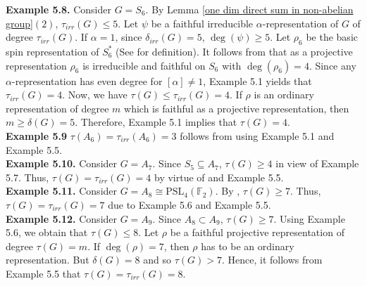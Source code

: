 \documentclass[a4paper,11pt]{amsart}
\numberwithin{equation}{section}
\numberwithin{equation}{subsection}
\newcommand{\F}{\mathbb{F}}
\newcommand{\di}{\delta_{irr}(G)}
\newcommand{\poonam}[1]{{\color{blue} #1}}
\begin{document}
\textbf{Example 5.8.} 
Consider $G= S_6$. By Lemma \ref{one dim direct sum in non-abelian group}$(2)$, $\tau_{irr}(G) \leq 5$. Let $\psi$ be a faithful irreducible $\alpha$-representation of $G$ of degree $\tau_{irr}(G)$. If $\alpha= 1$, since $\di=5$, $\deg(\psi) \geq 5$. Let $\rho_6$ be the basic spin representation of $S_6^*$ (See \cite[5.5.B.]{karpilovsky3} for definition). It follows from \cite[Chapter 5, Corollary 5.8, Theorem 5.12]{karpilovsky3} that as a projective representation $\rho_6$ is irreducible and faithful on $S_6$ with $\deg(\rho_6)= 4$. Since any $\alpha$-representation has even degree for $[\alpha] \neq 1$, Example 5.1 yields that $\tau_{irr}(G)= 4$. Now, we have $\tau(G) \leq \tau_{irr}(G)= 4$. If $\rho$ is an ordinary representation of degree $m$ which is faithful as a projective representation, then $m \geq \delta(G)= 5$. Therefore, Example 5.1 implies that $\tau(G)= 4$. \\ %

\textbf{Example 5.9} 
$\tau(A_6)= \tau_{irr}(A_6)= 3$ follows from \cite[Table 2]{gonzalo} using Example 5.1 and Example 5.5.     \\ 

\textbf{Example 5.10.} 
Consider $G = A_7$. Since $S_5 \subseteq A_7$, $\tau(G) \geq 4$ in view of Example 5.7. Thus, $\tau(G) = \tau_{irr}(G) =4$ by virtue of \cite[Table 3]{gonzalo} and Example 5.5.    \\

\textbf{Example 5.11.} 
Consider $G = A_8 \cong \mathrm{PSL}_4(\F_2)$. By \cite[Lemma 5.2]{LANDAZURI}, $\tau(G) \geq 7$. Thus, $\tau(G) = \tau_{irr}(G) = 7$ due to Example 5.6 and Example 5.5.    \\

\textbf{Example 5.12.} 
Consider $G = A_9$. Since $A_8 \subset A_9$, $\tau(G) \geq 7$. Using Example 5.6, we obtain that $\tau(G) \leq 8$. Let $\rho$ be a faithful projective representation of degree $\tau(G)=m$. If $\deg(\rho)=7$, then $\rho$ has to be an ordinary representation. But $\delta(G) = 8$ and so $\tau(G) > 7$. Hence, it follows from Example 5.5 that $\tau(G) = \tau_{irr}(G)= 8$.   \\

\end{document}
